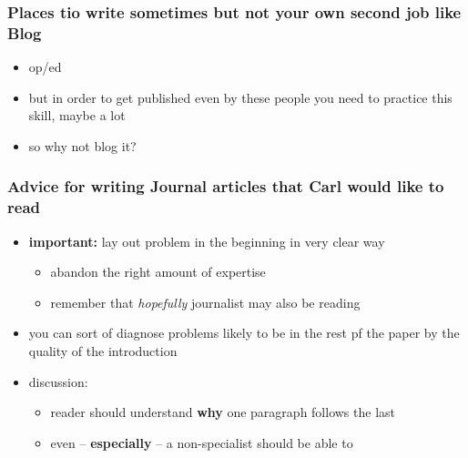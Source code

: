 \documentclass[letterpaper]{scrartcl}
\begin{document}
\subsubsection{Places tio write sometimes but not your own second job
like
Blog}\label{places-tio-write-sometimes-but-not-your-own-second-job-like-blog}

\begin{itemize}
\itemsep1pt\parskip0pt
\item
  op/ed
\item
  but in order to get published even by these people you need to
  practice this skill, maybe a lot
\item
  so why not blog it?
\end{itemize}

\subsubsection{Advice for writing Journal articles that Carl would like
to
read}\label{advice-for-writing-journal-articles-that-carl-would-like-to-read}

\begin{itemize}
\itemsep1pt\parskip0pt
\item
  \textbf{important:} lay out problem in the beginning in very clear way

  \begin{itemize}
  \itemsep1pt\parskip0pt
  \item
    abandon the right amount of expertise
  \item
    remember that \emph{hopefully} journalist may also be reading
  \end{itemize}
\item
  you can sort of diagnose problems likely to be in the rest pf the
  paper by the quality of the introduction
\item
  discussion:

  \begin{itemize}
  \itemsep1pt\parskip0pt
  \item
    reader should understand \textbf{why} one paragraph follows the last
  \item
    even -- \textbf{especially} -- a non-specialist should be able to
  \end{itemize}
\end{itemize}
\end{document}
